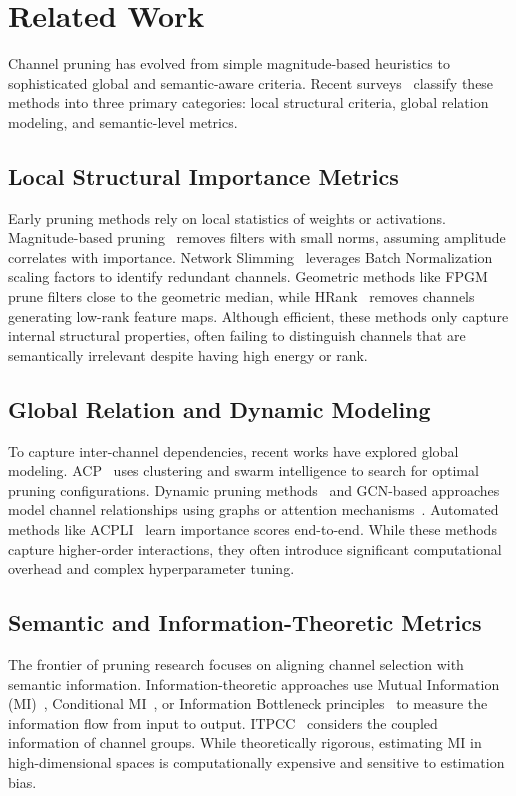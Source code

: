 \documentclass[sn-mathphys,Numbered]{sn-jnl}
\begin{document}
\section{Related Work}
\label{sec:related}

Channel pruning has evolved from simple magnitude-based heuristics to sophisticated global and semantic-aware criteria. Recent surveys~\cite{cheng2024survey,he2023structured} classify these methods into three primary categories: local structural criteria, global relation modeling, and semantic-level metrics.

\subsection{Local Structural Importance Metrics}
Early pruning methods rely on local statistics of weights or activations. Magnitude-based pruning~\cite{he2017channel,han2015deep} removes filters with small norms, assuming amplitude correlates with importance. Network Slimming~\cite{liu2017network_slimming} leverages Batch Normalization scaling factors to identify redundant channels. Geometric methods like FPGM~\cite{he2019fpgm} prune filters close to the geometric median, while HRank~\cite{lin2020hrank} removes channels generating low-rank feature maps. Although efficient, these methods only capture internal structural properties, often failing to distinguish channels that are semantically irrelevant despite having high energy or rank.

\subsection{Global Relation and Dynamic Modeling}
To capture inter-channel dependencies, recent works have explored global modeling. ACP~\cite{chang2022acp} uses clustering and swarm intelligence to search for optimal pruning configurations. Dynamic pruning methods~\cite{hu2023dynamic_pruning,chen2021dynamical} and GCN-based approaches~\cite{jiang2022channel} model channel relationships using graphs or attention mechanisms~\cite{cheng2023differentiable}. Automated methods like ACPLI~\cite{treszczotko2021acpli} learn importance scores end-to-end. While these methods capture higher-order interactions, they often introduce significant computational overhead and complex hyperparameter tuning.

\subsection{Semantic and Information-Theoretic Metrics}
The frontier of pruning research focuses on aligning channel selection with semantic information. Information-theoretic approaches use Mutual Information (MI)~\cite{lu2024enhancing}, Conditional MI~\cite{vuvan2024pruning}, or Information Bottleneck principles~\cite{mip2024mutual,dutta2024structured} to measure the information flow from input to output. ITPCC~\cite{rostami2025information} considers the coupled information of channel groups. While theoretically rigorous, estimating MI in high-dimensional spaces is computationally expensive and sensitive to estimation bias.
\end{document}
